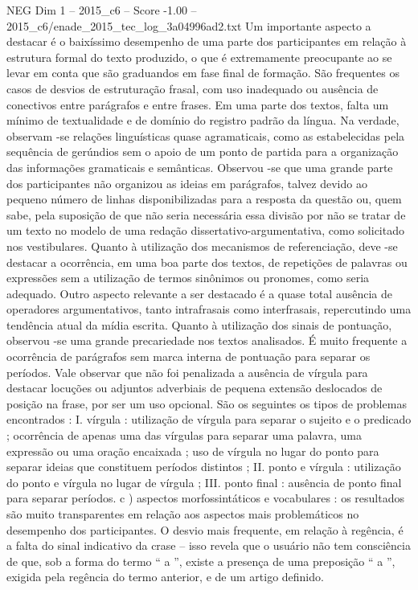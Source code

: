 \begin{textsample}{NEG Dim 1 – 2015\_c6 – Score -1.00 – 2015\_c6/enade\_2015\_tec\_log\_3a04996ad2.txt}
Um importante aspecto a destacar é o baixíssimo desempenho de uma parte dos participantes em relação à estrutura formal do texto produzido, o que é extremamente preocupante ao se levar em conta que são graduandos em fase final de formação.
São frequentes os casos de desvios de estruturação frasal, com uso inadequado ou ausência de conectivos entre parágrafos e entre frases.
Em uma parte dos textos, falta um mínimo de textualidade e de domínio do registro padrão da língua.
Na verdade, observam -se relações linguísticas quase agramaticais, como as estabelecidas pela sequência de gerúndios sem o apoio de um ponto de partida para a organização das informações gramaticais e semânticas.
Observou -se que uma grande parte dos participantes não organizou as ideias em parágrafos, talvez devido ao pequeno número de linhas disponibilizadas para a resposta da questão ou, quem sabe, pela suposição de que não seria necessária essa divisão por não se tratar de um texto no modelo de uma redação dissertativo-argumentativa, como solicitado nos vestibulares.
Quanto à utilização dos mecanismos de referenciação, deve -se destacar a ocorrência, em uma boa parte dos textos, de repetições de palavras ou expressões sem a utilização de termos sinônimos ou pronomes, como seria adequado.
Outro aspecto relevante a ser destacado é a quase total ausência de operadores argumentativos, tanto intrafrasais como interfrasais, repercutindo uma tendência atual da mídia escrita.
Quanto à utilização dos sinais de pontuação, observou -se uma grande precariedade nos textos analisados.
É muito frequente a ocorrência de parágrafos sem marca interna de pontuação para separar os períodos.
Vale observar que não foi penalizada a ausência de vírgula para destacar locuções ou adjuntos adverbiais de pequena extensão deslocados de posição na frase, por ser um uso opcional.
São os seguintes os tipos de problemas encontrados : I. vírgula : utilização de vírgula para separar o sujeito e o predicado ; ocorrência de apenas uma das vírgulas para separar uma palavra, uma expressão ou uma oração encaixada ; uso de vírgula no lugar do ponto para separar ideias que constituem períodos distintos ; II. ponto e vírgula : utilização do ponto e vírgula no lugar de vírgula ; III. ponto final : ausência de ponto final para separar períodos. c ) aspectos morfossintáticos e vocabulares : os resultados são muito transparentes em relação aos aspectos mais problemáticos no desempenho dos participantes.
O desvio mais frequente, em relação à regência, é a falta do sinal indicativo da crase – isso revela que o usuário não tem consciência de que, sob a forma do termo “ a ”, existe a presença de uma preposição “ a ”, exigida pela regência do termo anterior, e de um artigo definido.

\end{textsample}
